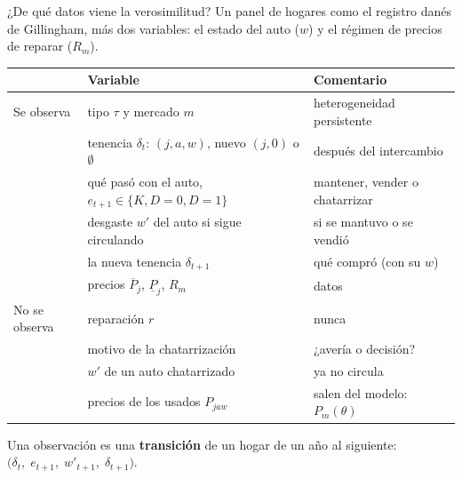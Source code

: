\documentclass[aspectratio=169,11pt]{beamer}
\newcommand{\idea}[1]{\vspace{-0.3em}\begin{block}{}\centering\small #1\end{block}}
\newcommand{\obs}[1]{{\color{verde}#1}}
\newcommand{\noobs}[1]{{\color{rojo}#1}}
\begin{document}
\begin{frame}{¿De qué datos viene la verosimilitud?}
  \small Un panel de hogares como el registro danés de Gillingham, más dos variables:
  el estado del auto ($w$) y el régimen de precios de reparar ($R_m$).
  \begin{center}\footnotesize
  \begin{tabular}{lll}
    \toprule
    & Variable & Comentario\\
    \midrule
    \obs{Se observa} & tipo $\tau$ y mercado $m$ & heterogeneidad persistente\\
    & tenencia $\delta_t$: $(j,a,w)$, nuevo $(j,0)$ o $\emptyset$ & después del intercambio\\
    & qué pasó con el auto, $e_{t+1}\in\{K,D{=}0,D{=}1\}$ & mantener, vender o chatarrizar\\
    & desgaste $w'$ del auto si sigue circulando & si se mantuvo o se vendió\\
    & la nueva tenencia $\delta_{t+1}$ & qué compró (con su $w$)\\
    & precios $\overline P_j$, $\underline P_j$, $R_m$ & datos\\
    \midrule
    \noobs{No se observa} & reparación $r$ & nunca\\
    & motivo de la chatarrización & ¿avería o decisión?\\
    & $w'$ de un auto chatarrizado & ya no circula\\
    & precios de los usados $P_{jaw}$ & salen del modelo: $P_m(\theta)$\\
    \bottomrule
  \end{tabular}
  \end{center}
  \idea{Una observación es una \textbf{transición} de un hogar de un año al siguiente:
  $\big(\delta_t,\;e_{t+1},\;w'_{t+1},\;\delta_{t+1}\big)$.}
\end{frame}
\end{document}

